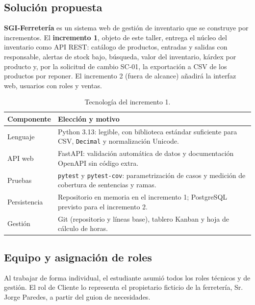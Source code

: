 \documentclass[11pt,a4paper]{article}
\newcommand{\cod}[1]{\texttt{\small #1}}
\begin{document}
\subsection{Solución propuesta}
\textbf{SGI-Ferretería} es un sistema web de gestión de inventario que se construye por incrementos. El \textbf{incremento 1}, objeto de este taller, entrega el núcleo del inventario como API REST: catálogo de productos, entradas y salidas con responsable, alertas de stock bajo, búsqueda, valor del inventario, kárdex por producto y, por la solicitud de cambio SC-01, la exportación a CSV de los productos por reponer. El incremento 2 (fuera de alcance) añadirá la interfaz web, usuarios con roles y ventas.

\begin{table}[H]
\centering\small
\caption{Tecnología del incremento 1.}
\begin{tabularx}{\linewidth}{@{}l L@{}}
\toprule
\textbf{Componente} & \textbf{Elección y motivo} \\
\midrule
Lenguaje & Python 3.13: legible, con biblioteca estándar suficiente para CSV, \cod{Decimal} y normalización Unicode. \\
API web & FastAPI: validación automática de datos y documentación OpenAPI sin código extra. \\
Pruebas & \cod{pytest} y \cod{pytest-cov}: parametrización de casos y medición de cobertura de sentencias y ramas. \\
Persistencia & Repositorio en memoria en el incremento 1; PostgreSQL previsto para el incremento 2. \\
Gestión & Git (repositorio y líneas base), tablero Kanban y hoja de cálculo de horas. \\
\bottomrule
\end{tabularx}
\end{table}

\subsection{Equipo y asignación de roles}\label{sec:roles}
Al trabajar de forma individual, el estudiante asumió todos los roles técnicos y de gestión. El rol de Cliente lo representa el propietario ficticio de la ferretería, Sr. Jorge Paredes, a partir del guion de necesidades.
\end{document}
